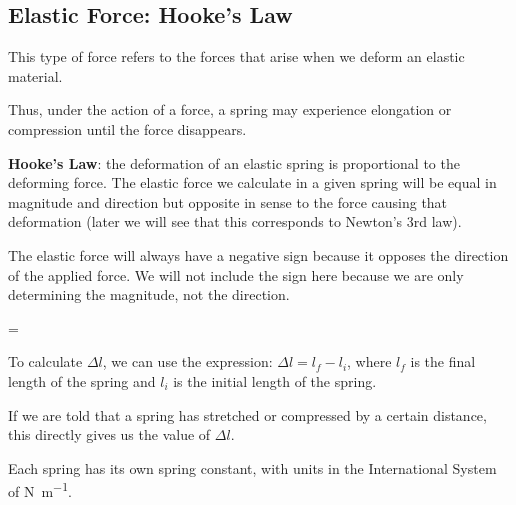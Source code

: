 \subsection{Elastic Force: Hooke's Law}

This type of force refers to the forces that arise when we deform an elastic material.

Thus, under the action of a force, a spring may experience elongation or compression until the force disappears.

\begin{dBox}
    \textbf{Hooke's Law}: the deformation of an elastic spring is proportional to the deforming force.
    The elastic force we calculate in a given spring will be equal in magnitude and direction but opposite in sense to the force causing that deformation (later we will see that this corresponds to Newton's 3rd law).
\end{dBox}

\begin{remark}
    The elastic force will always have a negative sign because it opposes the direction of the applied force.
    We will not include the sign here because we are only determining the magnitude, not the direction.
\end{remark}

\vspace*{20pt}
\begin{centeredequation}
    =
    \cdot
\end{centeredequation}
\vspace*{12pt}

To calculate \( \Delta l \), we can use the expression: \( \Delta l = l_f - l_i \), where \( l_f \) is the final length of the spring and \( l_i \) is the initial length of the spring.

\begin{remark}
    If we are told that a spring has stretched or compressed by a certain distance, this directly gives us the value of \( \Delta l \).
\end{remark}

Each spring has its own spring constant, with units in the International System of \unit{\newton\per\metre}.

